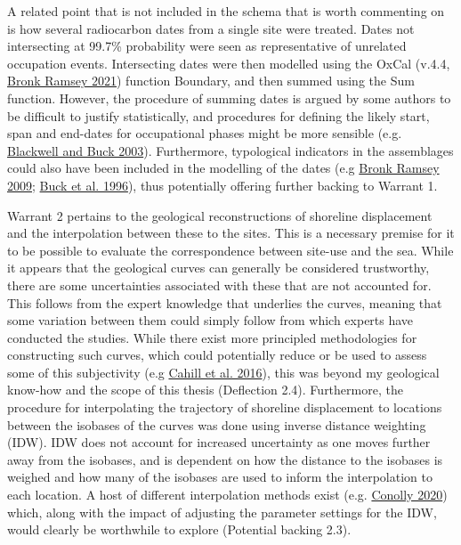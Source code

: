\documentclass[
  12pt,
  a4paper,
  oneside]{book}
\begin{document}
A related point that is not included in the schema that is worth commenting on is how several radiocarbon dates from a single site were treated. Dates not intersecting at 99.7\% probability were seen as representative of unrelated occupation events. Intersecting dates were then modelled using the OxCal (v.4.4, \protect\hyperlink{ref-bronkramsey2021}{Bronk Ramsey 2021}) function Boundary, and then summed using the Sum function. However, the procedure of summing dates is argued by some authors to be difficult to justify statistically, and procedures for defining the likely start, span and end-dates for occupational phases might be more sensible (e.g. \protect\hyperlink{ref-blackwell2003}{Blackwell and Buck 2003}). Furthermore, typological indicators in the assemblages could also have been included in the modelling of the dates (e.g \protect\hyperlink{ref-bronkramsey2009}{Bronk Ramsey 2009}; \protect\hyperlink{ref-buck1996}{Buck et al. 1996}), thus potentially offering further backing to Warrant 1.

Warrant 2 pertains to the geological reconstructions of shoreline displacement and the interpolation between these to the sites. This is a necessary premise for it to be possible to evaluate the correspondence between site-use and the sea. While it appears that the geological curves can generally be considered trustworthy, there are some uncertainties associated with these that are not accounted for. This follows from the expert knowledge that underlies the curves, meaning that some variation between them could simply follow from which experts have conducted the studies. While there exist more principled methodologies for constructing such curves, which could potentially reduce or be used to assess some of this subjectivity (e.g \protect\hyperlink{ref-cahill2016}{Cahill et al. 2016}), this was beyond my geological know-how and the scope of this thesis (Deflection 2.4). Furthermore, the procedure for interpolating the trajectory of shoreline displacement to locations between the isobases of the curves was done using inverse distance weighting (IDW). IDW does not account for increased uncertainty as one moves further away from the isobases, and is dependent on how the distance to the isobases is weighed and how many of the isobases are used to inform the interpolation to each location. A host of different interpolation methods exist (e.g. \protect\hyperlink{ref-conolly2020}{Conolly 2020}) which, along with the impact of adjusting the parameter settings for the IDW, would clearly be worthwhile to explore (Potential backing 2.3).
\end{document}
